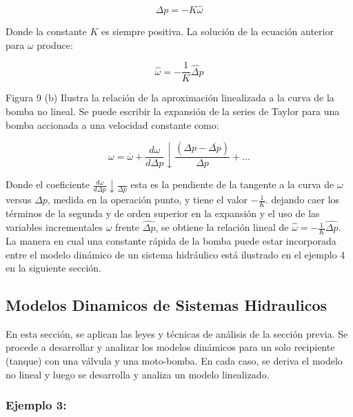 \documentclass[a4paper,12pt,twoside]{proyectotanquesecci}
\begin{document}
\begin{equation}
\Delta p=-K\widehat {\omega}
\end{equation}

Donde la constante $K$ es siempre positiva. La solución de la ecuación anterior para $\omega$ produce:

\begin{equation}
\widehat {\omega}=-\frac {1}{K}\widehat {\Delta p}
\end{equation}

Figura 9 (b) Ilustra la relación de la aproximación linealizada a la curva de la bomba no lineal. Se puede escribir la expansión de la series de Taylor para una bomba accionada a una velocidad constante como:

\begin{equation}
\omega =\overline {\omega }+\frac {d\omega }{d\Delta p} \downarrow \frac {\left( \Delta p-\overline {\Delta p}\right)}{\Delta p} +\ldots 
\end{equation}

Donde el coeficiente $\frac {d\omega }{d\Delta p} \downarrow \frac {}{\Delta p}$ esta es la pendiente de la tangente a la curva de $\omega$ versus $\Delta p$, medida en la operación punto, y tiene el valor $-\frac{1}{K}$. dejando caer los términos de la segunda y de orden superior en la expansión y el uso de las variables incrementales $\omega$ frente $\widehat{\Delta p}$, se obtiene la relación lineal de $\widehat {\omega}=-\frac {1}{K}\widehat {\Delta p}$. \\
La manera en cual una constante rápida de la bomba puede estar incorporada entre el modelo dinámico de un sistema hidráulico está ilustrado en el ejemplo 4 en la siguiente sección. \\

\subsection{Modelos Dinamicos de Sistemas Hidraulicos}

En esta sección, se aplican las leyes y técnicas de análisis de la sección previa. Se procede a desarrollar y analizar los modelos dinámicos para un solo recipiente (tanque) con una válvula y una moto-bomba. En cada caso, se deriva el modelo no lineal y luego se desarrolla y analiza un modelo linealizado. \\

\subsubsection{Ejemplo 3:}
\end{document}
